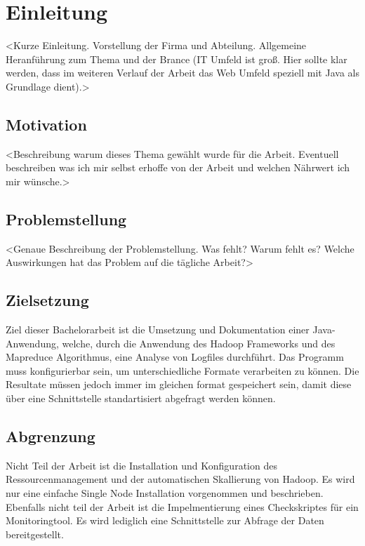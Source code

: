 
\chapter{Einleitung}\label{cha:Einleitung}
<Kurze Einleitung. Vorstellung der Firma und Abteilung. Allgemeine Heranführung zum Thema und der Brance (IT Umfeld ist groß. Hier sollte klar werden, dass im weiteren Verlauf der Arbeit das Web Umfeld speziell mit Java als Grundlage dient).>

\section{Motivation}\label{sec:Motivation}
<Beschreibung warum dieses Thema gewählt wurde für die Arbeit. Eventuell beschreiben was ich mir selbst erhoffe von der Arbeit und welchen Nährwert ich mir wünsche.>

\section{Problemstellung}\label{sec:Problemstellung}
<Genaue Beschreibung der Problemstellung. Was fehlt? Warum fehlt es? Welche Auswirkungen hat das Problem auf die tägliche Arbeit?>

\section{Zielsetzung}\label{sec:Zielsetzung}
Ziel dieser Bachelorarbeit ist die Umsetzung und Dokumentation einer Java-Anwendung, welche, durch die Anwendung des Hadoop Frameworks und des Mapreduce Algorithmus, eine Analyse von Logfiles durchführt. Das Programm muss konfigurierbar sein, um unterschiedliche Formate verarbeiten zu können. Die  Resultate müssen jedoch immer im gleichen format gespeichert sein, damit diese über eine Schnittstelle standartisiert abgefragt werden können.



\section{Abgrenzung}\label{sec:Abgrenzung}
Nicht Teil der Arbeit ist die Installation und Konfiguration des Ressourcenmanagement und der automatischen Skallierung von Hadoop. Es wird nur eine einfache Single Node Installation vorgenommen und beschrieben. Ebenfalls nicht teil der Arbeit ist die Impelmentierung eines Checkskriptes für ein Monitoringtool. Es wird lediglich eine Schnittstelle zur Abfrage der Daten bereitgestellt.

